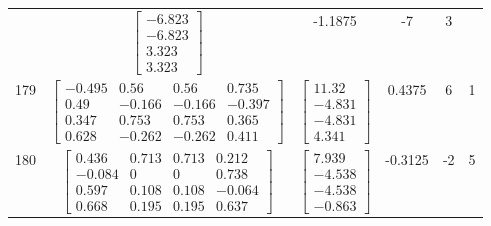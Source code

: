 \documentclass[a4paper,12pt]{article}
\begin{document}
\begin{tabular}{c c c c c c}
&
$\begin{bmatrix} -6.823 \\ -6.823 \\ 3.323 \\ 3.323 \end{bmatrix}$
&
-1.1875
&
-7
&
3
\\
179
&
$\begin{bmatrix} -0.495 & 0.56 & 0.56 & 0.735 \\ 0.49 & -0.166 & -0.166 & -0.397 \\ 0.347 & 0.753 & 0.753 & 0.365 \\ 0.628 & -0.262 & -0.262 & 0.411 \end{bmatrix}$
&
$\begin{bmatrix} 11.32 \\ -4.831 \\ -4.831 \\ 4.341 \end{bmatrix}$
&
0.4375
&
6
&
1
\\
180
&
$\begin{bmatrix} 0.436 & 0.713 & 0.713 & 0.212 \\ -0.084 & 0 & 0 & 0.738 \\ 0.597 & 0.108 & 0.108 & -0.064 \\ 0.668 & 0.195 & 0.195 & 0.637 \end{bmatrix}$
&
$\begin{bmatrix} 7.939 \\ -4.538 \\ -4.538 \\ -0.863 \end{bmatrix}$
&
-0.3125
&
-2
&
5
\\
\end{tabular} \egroup \newpage
\end{document}
